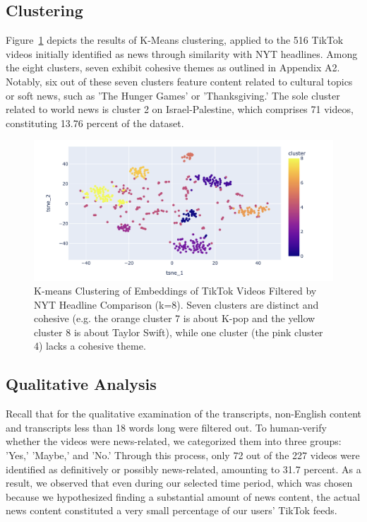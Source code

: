 \documentclass{article}
\begin{document}
\subsection{Clustering}
Figure~\ref{fig:clustering} depicts the results of K-Means clustering, applied to the 516 TikTok videos initially identified as news through similarity with NYT headlines. Among the eight clusters, seven exhibit cohesive themes as outlined in Appendix A2. Notably, six out of these seven clusters feature content related to cultural topics or soft news, such as 'The Hunger Games' or 'Thanksgiving.' The sole cluster related to world news is cluster 2 on Israel-Palestine, which comprises 71 videos, constituting 13.76 percent of the dataset. \newline


\begin{figure}[h!]
    \centering
    \includegraphics[width=0.9\linewidth]{cluster.png} 
    \caption{K-means Clustering of Embeddings of TikTok Videos Filtered by NYT Headline Comparison (k=8). Seven clusters are distinct and cohesive (e.g. the orange cluster 7 is about K-pop and the yellow cluster 8 is about Taylor Swift), while one cluster (the pink cluster 4) lacks a cohesive theme.}
    \label{fig:clustering} 
\end{figure}

\subsection{Qualitative Analysis}
Recall that for the qualitative examination of the transcripts, non-English content and transcripts less than 18 words long were filtered out. To human-verify whether the videos were news-related, we categorized them into three groups: 'Yes,' 'Maybe,' and 'No.' Through this process, only 72 out of the 227 videos were identified as definitively or possibly news-related, amounting to 31.7 percent. As a result, we observed that even during our selected time period, which was chosen because we hypothesized finding a substantial amount of news content, the actual news content constituted a very small percentage of our users' TikTok feeds. ~\newline
\end{document}
